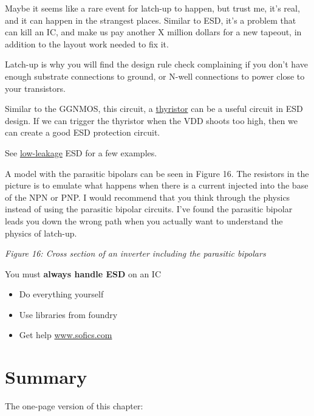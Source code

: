 Maybe it seems like a rare event for latch-up to happen, but trust me,
it's real, and it can happen in the strangest places. Similar to ESD,
it's a problem that can kill an IC, and make us pay another X million
dollars for a new tapeout, in addition to the layout work needed to fix
it.

Latch-up is why you will find the design rule check complaining if you
don't have enough substrate connections to ground, or N-well connections
to power close to your transistors.

Similar to the GGNMOS, this circuit, a
\href{https://en.wikipedia.org/wiki/Thyristor}{thyristor} can be a
useful circuit in ESD design. If we can trigger the thyristor when the
VDD shoots too high, then we can create a good ESD protection circuit.

See \href{https://www.sofics.com/features/low-leakage/}{low-leakage} ESD
for a few examples.

A model with the parasitic bipolars can be seen in Figure 16. The
resistors in the picture is to emulate what happens when there is a
current injected into the base of the NPN or PNP. I would recommend that
you think through the physics instead of using the parasitic bipolar
circuits. I've found the parasitic bipolar leads you down the wrong path
when you actually want to understand the physics of latch-up.


{
\centering
{}
}

\emph{Figure 16: Cross section of an inverter including the parasitic
bipolars }

You must \textbf{always handle ESD} on an IC

\begin{itemize}
\tightlist
\item
  Do everything yourself
\item
  Use libraries from foundry
\item
  Get help \href{http://www.sofics.com}{www.sofics.com}
\end{itemize}

\section{Summary}\label{summary}

The one-page version of this chapter:

